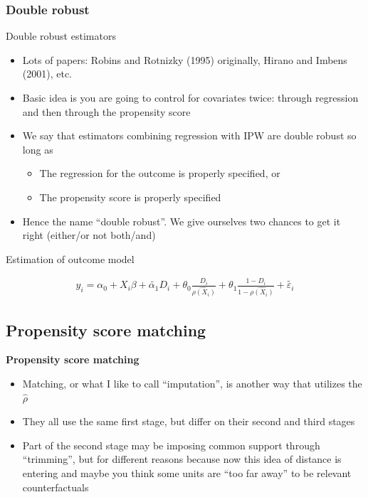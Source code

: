 \documentclass{beamer}
\begin{document}
\subsubsection{Double robust}
\begin{frame}{Double robust estimators}

\begin{itemize}
\item Lots of papers: Robins and Rotnizky (1995) originally, Hirano and Imbens (2001), etc.
\item Basic idea is you are going to control for covariates twice: through regression and then through the propensity score
\item We say that estimators combining regression with IPW are double robust so long as
	\begin{itemize}
	\item The regression for the outcome is properly specified, or
	\item The propensity score is properly specified
	\end{itemize}
\item Hence the name ``double robust''. We give ourselves two chances to get it right (either/or not both/and)
\end{itemize}

\end{frame}

\begin{frame}{Estimation of outcome model}

\begin{eqnarray*}
y_i = \alpha_0 + X_i\beta + \tilde{\alpha_1} D_i + \theta_0 \frac{D_i}{\widehat{\rho (X_i)}} + \theta_1 \frac{1-D_i}{1- \widehat{\rho (X_i)}} + \tilde{\varepsilon_i}
\end{eqnarray*}

\end{frame}

\subsection{Propensity score matching}

\begin{frame}

	\begin{center}
	\textbf{Propensity score matching}
	\end{center}
	
	\begin{itemize}
	\item Matching, or what I like to call ``imputation'', is another way that utilizes the $\widehat{\rho}$
	\item They all use the same first stage, but differ on their second and third stages
	\item Part of the second stage may be imposing common support through ``trimming'', but for different reasons because now this idea of distance is entering and maybe you think some units are ``too far away'' to be relevant counterfactuals
	\end{itemize}

\end{frame}
\end{document}

